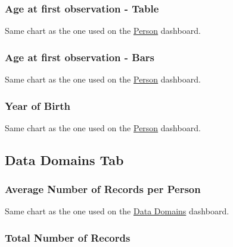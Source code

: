 \documentclass[
]{book}
\begin{document}
\hypertarget{age-at-first-observation---table}{%
\subsubsection*{Age at first observation - Table}\label{age-at-first-observation---table}}

Same chart as the one used on the \protect\hyperlink{age1ObservationTable}{Person} dashboard.

\hypertarget{age-at-first-observation---bars}{%
\subsubsection*{Age at first observation - Bars}\label{age-at-first-observation---bars}}

Same chart as the one used on the \protect\hyperlink{age1ObservationBars}{Person} dashboard.

\hypertarget{year-of-birth}{%
\subsubsection*{Year of Birth}\label{year-of-birth}}

Same chart as the one used on the \protect\hyperlink{yearOfBirth}{Person} dashboard.

\hypertarget{data-domains-tab}{%
\subsection*{Data Domains Tab}\label{data-domains-tab}}

\hypertarget{average-number-of-records-per-person}{%
\subsubsection*{Average Number of Records per Person}\label{average-number-of-records-per-person}}

Same chart as the one used on the \protect\hyperlink{avgRecordsPerPerson}{Data Domains} dashboard.

\hypertarget{total-number-of-records}{%
\subsubsection*{Total Number of Records}\label{total-number-of-records}}
\end{document}
